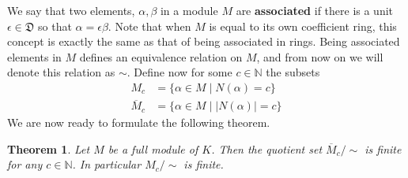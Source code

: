 \documentclass{article}
\newtheorem{theorem}{Theorem}[section]
\newcommand{\mfrak}[1]{\mathfrak{#1}}
\newcommand{\mbb}[1]{\mathbb{#1}}
\begin{document}
We say that two elements, $\alpha,\beta$ in a module $M$ are \textbf{associated} if there is a unit $\epsilon \in \mfrak D$ so that $\alpha = \epsilon \beta$. Note that when $M$ is equal to its own coefficient ring, this concept is exactly the same as that of being associated in rings. Being associated elements in $M$ defines an equivalence relation on $M$, and from now on we will denote this relation as $\sim$. Define now for some $c \in \mbb N$ the subsets
\begin{align*}
    M_c &= \{ \alpha \in M \mid N(\alpha) = c\} \\
    \overline M_c &= \{ \alpha \in M \mid | N(\alpha) | = c\}
\end{align*}
We are now ready to formulate the following theorem.
\begin{theorem} 
    Let $M$ be a full module of $K$. Then the quotient set $\overline M_c / \sim$ is finite for any $c \in \mbb N$. In particular $M_c / \sim$ is finite.
\end{theorem}
\end{document}
